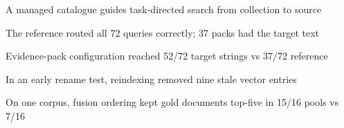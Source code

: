 \begin{highlights}
\item A managed catalogue guides task-directed search from collection to source
\item The reference routed all 72 queries correctly; 37 packs had the target text
\item Evidence-pack configuration reached 52/72 target strings vs 37/72 reference
\item In an early rename test, reindexing removed nine stale vector entries
\item On one corpus, fusion ordering kept gold documents top-five in 15/16 pools vs 7/16
\end{highlights}
